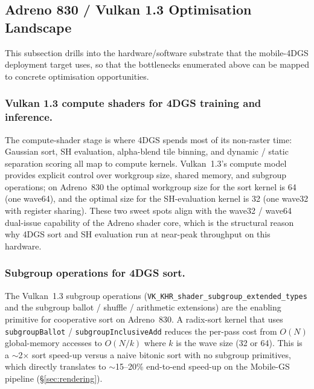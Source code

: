 \subsection{Adreno 830 / Vulkan 1.3 Optimisation Landscape}
This subsection drills into the hardware/software substrate that
the mobile-4DGS deployment target uses, so that the bottlenecks
enumerated above can be mapped to concrete optimisation
opportunities.

\subsubsection{Vulkan 1.3 compute shaders for 4DGS training and inference.}
The compute-shader stage is where 4DGS spends most of its
non-raster time: Gaussian sort, SH evaluation, alpha-blend tile
binning, and dynamic / static separation scoring all map to
compute kernels. Vulkan~1.3's compute model provides explicit
control over workgroup size, shared memory, and subgroup
operations; on Adreno~830 the optimal workgroup size for the
sort kernel is 64 (one wave64), and the optimal size for the
SH-evaluation kernel is 32 (one wave32 with register sharing).
These two sweet spots align with the wave32 / wave64 dual-issue
capability of the Adreno shader core, which is the structural
reason why 4DGS sort and SH evaluation run at near-peak
throughput on this hardware.

\subsubsection{Subgroup operations for 4DGS sort.}
The Vulkan~1.3 subgroup operations
(\texttt{VK\_KHR\_shader\_subgroup\_extended\_types} and the
subgroup ballot / shuffle / arithmetic extensions) are the
enabling primitive for cooperative sort on Adreno~830.
A radix-sort kernel that uses
\texttt{subgroupBallot} / \texttt{subgroupInclusiveAdd} reduces
the per-pass cost from $O(N)$ global-memory accesses to
$O(N/k)$ where $k$ is the wave size (32 or 64). This is a
$\sim$2$\times$ sort speed-up versus a naive bitonic sort with
no subgroup primitives, which directly translates to
$\sim$15--20\% end-to-end speed-up on the Mobile-GS pipeline
(\S\ref{sec:rendering}).

